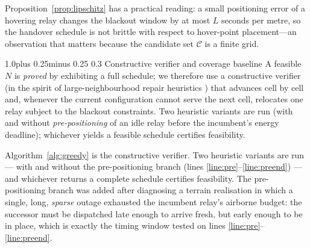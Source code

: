 \documentclass[11pt]{article}
\makeatletter
\def\subsection{\@startsection{subsection}{2}{\z@}%
    {1.0\baselineskip plus 0.25\baselineskip minus 0.25\baselineskip}%
    {0.3\baselineskip}%
    {\normalfont\normalsize\itshape}}%
\theoremstyle{dshplain}
\theoremstyle{dshdefn}
\makeatother
\begin{document}
\noindent Proposition~\ref{prop:lipschitz} has a practical reading: a small
positioning error of a hovering relay changes the blackout window by at most
$L$ seconds per metre, so the handover schedule is not brittle with respect to
hover-point placement---an observation that matters because the candidate set
$\mathcal{C}$ is a finite grid.

\subsection{Constructive verifier and coverage baseline}
\label{sec:verifier}
A feasible $N$ is \emph{proved} by exhibiting a full schedule; we therefore use a
constructive verifier (in the spirit of large-neighbourhood repair heuristics
\cite{alns}) that advances cell by cell and, whenever the current
configuration cannot serve the next cell, relocates one relay subject to the
blackout constraints. Two heuristic variants are run (with and without
\emph{pre-positioning} of an idle relay before the incumbent's energy deadline);
whichever yields a feasible schedule certifies feasibility.

Algorithm~\ref{alg:greedy} is the constructive verifier. Two heuristic
variants are run --- with and without the pre-positioning branch (lines
\ref{line:pre}--\ref{line:preend}) --- and whichever returns a complete schedule
certifies feasibility. The pre-positioning branch was added after diagnosing a
terrain realisation in which a single, long, \emph{sparse} outage exhausted the
incumbent relay's airborne budget: the successor must be dispatched late enough
to arrive fresh, but early enough to be in place, which is exactly the timing
window tested on lines \ref{line:pre}--\ref{line:preend}.
\end{document}

